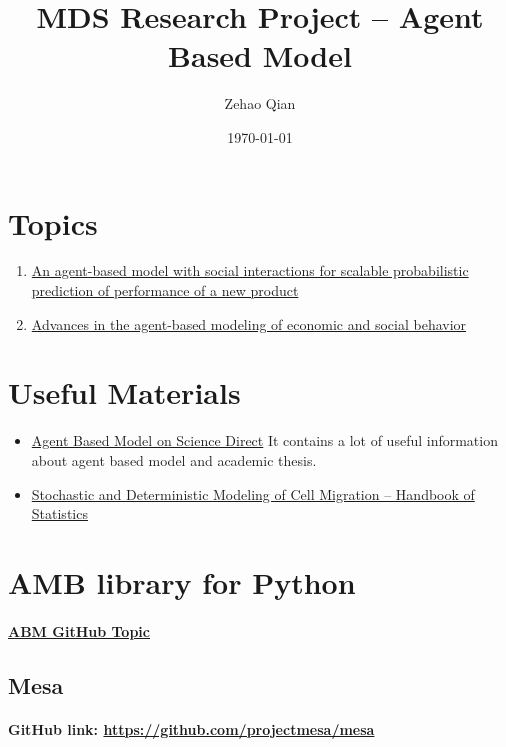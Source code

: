 \documentclass{article}
\begin{document}
% 
% 
\title{MDS Research Project -- Agent Based Model}
\author{Zehao Qian}
\date{\today}
\maketitle
% 
\section{Topics}
\begin{enumerate}
    \item \href{https://www.sciencedirect.com/science/article/pii/S2667096822000702}{An agent-based model with social interactions for scalable probabilistic prediction of performance of a new product}
    \item \href{https://link.springer.com/article/10.1007/s43546-021-00103-3}{Advances in the agent-based modeling of economic and social behavior}
\end{enumerate}
%
\section{Useful Materials}
% 
% 
\begin{itemize}
    \item \href{https://www.sciencedirect.com/topics/mathematics/agent-based-model}{Agent Based Model on Science Direct} It contains a lot of useful information about agent based model and academic thesis.
    \item \href{https://www.sciencedirect.com/science/article/abs/pii/S0169716118300075}{Stochastic and Deterministic Modeling of Cell Migration -- Handbook of Statistics}
\end{itemize}
% 
% 
% 
% 
% 
% 
% 
% 
% 
% 
% 
% 
\section{AMB library for Python}
\paragraph{\href{https://github.com/topics/agent-based-modeling}{ABM GitHub Topic}}
% 
% 
% 
\subsection{Mesa}
\paragraph{GitHub link: \href{https://github.com/projectmesa/mesa}{https://github.com/projectmesa/mesa}}
\end{document}
